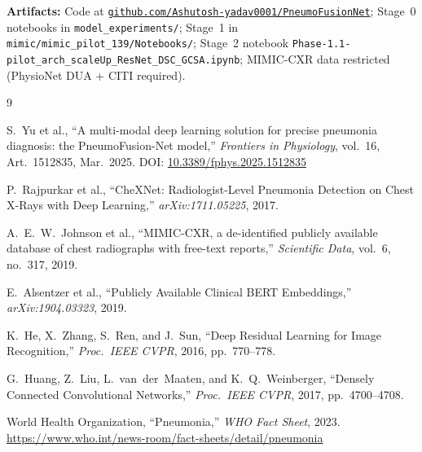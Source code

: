 \documentclass{article}
\begin{document}
\textbf{Artifacts:} Code at \href{https://github.com/Ashutosh-yadav0001/PneumoFusionNet}
{\texttt{github.com/Ashutosh-yadav0001/PneumoFusionNet}}; Stage~0 notebooks in
\texttt{model\_experiments/}; Stage~1 in \texttt{mimic/mimic\_pilot\_139/Notebooks/};
Stage~2 notebook \texttt{Phase-1.1-pilot\_arch\_scaleUp\_ResNet\_DSC\_GCSA.ipynb};
MIMIC-CXR data restricted (PhysioNet DUA + CITI required).


\clearpage
\small
\begin{thebibliography}{9}

S.~Yu et al., ``A multi-modal deep learning solution for precise pneumonia
diagnosis: the PneumoFusion-Net model,'' \emph{Frontiers in Physiology},
vol.~16, Art.~1512835, Mar.\ 2025.
DOI: \href{https://doi.org/10.3389/fphys.2025.1512835}{10.3389/fphys.2025.1512835}

P.~Rajpurkar et al., ``CheXNet: Radiologist-Level Pneumonia Detection on Chest
X-Rays with Deep Learning,'' \emph{arXiv:1711.05225}, 2017.

A.~E.~W.~Johnson et al., ``MIMIC-CXR, a de-identified publicly available
database of chest radiographs with free-text reports,''
\emph{Scientific Data}, vol.~6, no.~317, 2019.

E.~Alsentzer et al., ``Publicly Available Clinical BERT Embeddings,''
\emph{arXiv:1904.03323}, 2019.

K.~He, X.~Zhang, S.~Ren, and J.~Sun, ``Deep Residual Learning for Image
Recognition,'' \emph{Proc.\ IEEE CVPR}, 2016, pp.~770--778.

G.~Huang, Z.~Liu, L.~van~der~Maaten, and K.~Q.~Weinberger,
``Densely Connected Convolutional Networks,''
\emph{Proc.\ IEEE CVPR}, 2017, pp.~4700--4708.

World Health Organization, ``Pneumonia,'' \emph{WHO Fact Sheet}, 2023.
\url{https://www.who.int/news-room/fact-sheets/detail/pneumonia}

\end{thebibliography}
\end{document}

